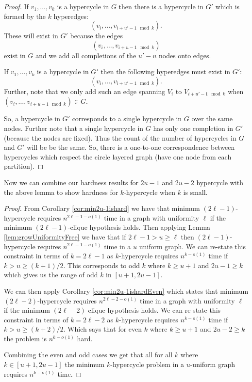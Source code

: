 \documentclass[11pt,letterpaper,pdftex]{article}
\begin{document}
\begin{proof}
If $v_1, \ldots, v_k$ is a hypercycle in $G$ then there is a hypercycle in $G'$ which is formed by the $k$ hyperedges: 
$$(v_i, \ldots, v_{i+u'-1 \mod k}).$$
These will exist in $G'$ because the edges 
$$(v_i, \ldots, v_{i+u-1 \mod k})$$
exist in $G$ and we add all completions of the $u'-u$ nodes onto edges. 

If $v_1, \ldots, v_k$ is a hypercycle in $G'$ then the following hyperedges must exist in $G'$:
$$(v_i, \ldots, v_{i+u'-1 \mod k}).$$
Further, note that we only add such an edge spanning $V_i$ to $V_{i+u'-1 \mod k}$ when $(v_i, \ldots, v_{i+u-1 \mod k}) \in G$. 

So, a hypercycle in $G'$ corresponds to a single hypercycle in $G$ over the same nodes. Further note that a single hypercycle in $G$ has only one completion in $G'$ (because the nodes are fixed). Thus the count of the number of hypercycles in $G$ and $G'$ will be be the same. So, there is a one-to-one correspondence between hypercycles which respect the circle layered graph (have one node from each partition). 
\end{proof}

Now we can combine our hardness results for $2u-1$ and $2u-2$ hypercycle with the above lemma to show hardness for $k$-hypercycle when $k$ is small. 

\weightedCycleLB*
\begin{proof}
    From Corollary \ref{cor:min2u-1ishard} we have that minimum $(2\ell-1)$-hypercycle requires $n^{2\ell-1-o(1)}$ time in a graph with uniformity $\ell$ if the minimum $(2\ell-1)$-clique hypothesis holds. Then applying Lemma \ref{lem:growUniformityFree} we have that 
    if $2\ell-1 > u \geq \ell$ then $(2\ell-1)$-hypercycle requires $n^{2\ell-1-o(1)}$ time in a $u$ uniform graph. We can re-state this constraint in terms of $k = 2\ell-1$ as $k$-hypercycle requires $n^{k-o(1)}$ time if $k > u \geq (k+1)/2$. This corresponds to odd $k$ where $k \geq u+1$ and $2u-1 \geq k$ which gives us the range of odd $k$ in $[u+1, 2u-1]$.

    We can then apply Corollary \ref{cor:min2u-1ishardEven} which states that  minimum $(2\ell-2)$-hypercycle requires $n^{2\ell-2-o(1)}$ time in a graph with uniformity $\ell$ if the minimum $(2\ell-2)$-clique hypothesis holds. We can re-state this constraint in terms of $k = 2\ell-2$ as $k$-hypercycle requires $n^{k-o(1)}$ time if $k > u \geq (k+2)/2$. Which says that for even $k$ where $k \geq u+1$ and $2u-2 \geq k$ the problem is $n^{k-o(1)}$ hard. 

    Combining the even and odd cases we get that all for all $k$ where $k \in [u+1, 2u-1]$ the minimum $k$-hypercycle problem in a $u$-uniform graph requires $n^{k-o(1)}$ time. 
\end{proof} 
\end{document}
